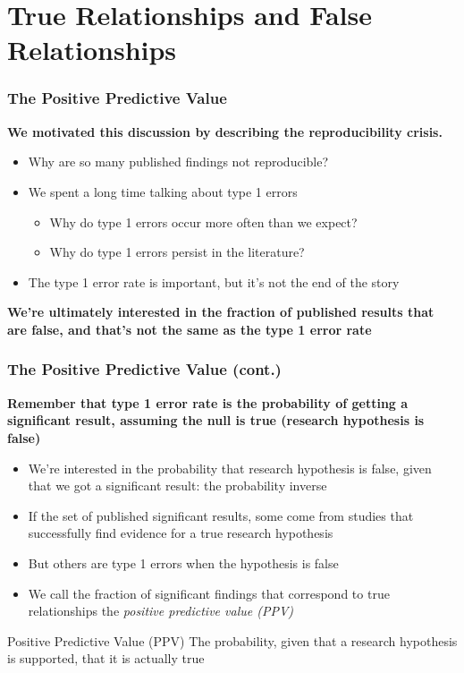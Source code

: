 \documentclass[10pt, block=fill]{beamer}
\begin{document}
\section{True Relationships and False Relationships}

\begin{frame}
    \frametitle{The Positive Predictive Value}
    
    \textbf{We motivated this discussion by describing the reproducibility crisis.} 
    
    \begin{itemize}
        \item Why are so many published findings not reproducible?
        \item We spent a long time talking about type 1 errors
        \begin{itemize}
            \item Why do type 1 errors occur more often than we expect?
            \item Why do type 1 errors persist in the literature?
        \end{itemize}
        \item The type 1 error rate is important, but it's not the end of the story
    \end{itemize}
    
    \textbf{We're ultimately interested in the fraction of published results that are false, and that's not the same as the type 1 error rate}
\end{frame}

\begin{frame}
    \frametitle{The Positive Predictive Value (cont.)}
    
    \textbf{Remember that type 1 error rate is the probability of getting a significant result, assuming the null is true (research hypothesis is false)}
    \begin{itemize}
        \item We're interested in the probability that research hypothesis is false, given that we got a significant result: the probability inverse
        \item If the set of published significant results, some come from studies that successfully find evidence for a true research hypothesis
        \item But others are type 1 errors when the hypothesis is false
        \item We call the fraction of significant findings that correspond to true relationships the \textit{positive predictive value (PPV)}
    \end{itemize}
    
    \begin{block}{Positive Predictive Value (PPV)}
        The probability, given that a research hypothesis is supported, that it is actually true
    \end{block}
\end{frame}
\end{document}
